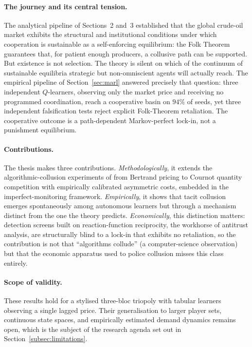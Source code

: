 \paragraph{The journey and its central tension.}
The analytical pipeline of Sections~2 and~3 established that the
global crude-oil market exhibits the structural and institutional
conditions under which cooperation is sustainable as a
self-enforcing equilibrium: the Folk Theorem guarantees that, for
patient enough producers, a collusive path can be
supported. But existence is not selection. The theory is silent
on which of the continuum of sustainable equilibria
strategic but non-omniscient agents will actually reach. The
empirical pipeline of Section~\ref{sec:marl} answered precisely that question:
three independent $Q$-learners, observing only the market price
and receiving no programmed coordination, reach a cooperative
basin on $94\%$ of seeds, yet three independent falsification
tests reject explicit Folk-Theorem retaliation. The cooperative
outcome is a path-dependent Markov-perfect lock-in, not a
punishment equilibrium.

\paragraph{Contributions.}
The thesis makes three contributions. \emph{Methodologically}, it
extends the algorithmic-collusion experiments of
\citet{calvano2020} from Bertrand pricing to Cournot quantity
competition with empirically calibrated asymmetric costs, embedded
in the \citet{greenporter1984} imperfect-monitoring framework.
\emph{Empirically}, it shows that tacit collusion emerges
spontaneously among autonomous learners but through a mechanism
distinct from the one the theory predicts. \emph{Economically},
this distinction matters: detection screens built on
reaction-function reciprocity, the workhorse of antitrust
analysis, are structurally blind to a lock-in that exhibits no
retaliation, so the contribution is not that ``algorithms
collude'' (a computer-science observation) but that the
economic apparatus used to police collusion misses this
class entirely.

\paragraph{Scope of validity.}
These results hold for a stylised three-bloc triopoly with
tabular learners observing a single lagged price. Their
generalisation to larger player sets, continuous state spaces, and
empirically estimated demand dynamics remains open, which is the
subject of the research agenda set out in
Section~\ref{subsec:limitations}.

